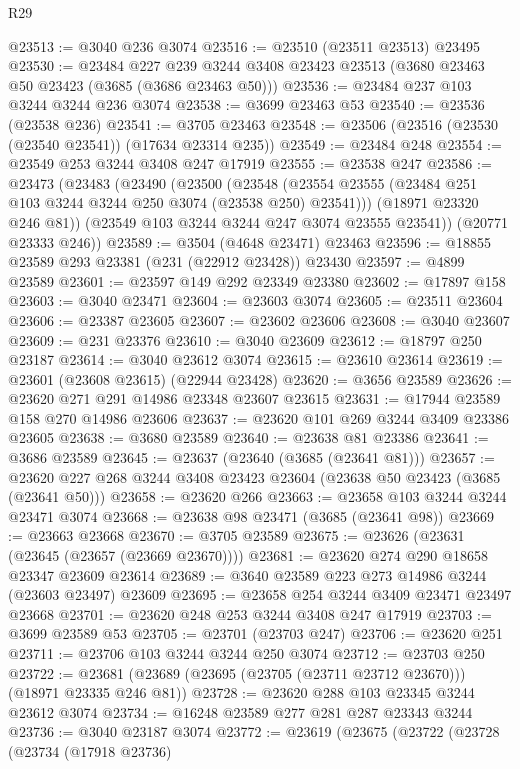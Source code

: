 \begin{lexlean}{R29}
\begin{coremodule}
@23513 := @3040 @236 @3074
@23516 := @23510 (@23511 @23513) @23495
@23530 := @23484
    @227
    @239
    @3244
    @3408
    @23423
    @23513
    (@3680 @23463 @50 @23423 (@3685 (@3686 @23463 @50)))
@23536 := @23484 @237 @103 @3244 @3244 @236 @3074
@23538 := @3699 @23463 @53
@23540 := @23536 (@23538 @236)
@23541 := @3705 @23463
@23548 := @23506 (@23516 (@23530 (@23540 @23541)) (@17634 @23314 @235))
@23549 := @23484 @248
@23554 := @23549 @253 @3244 @3408 @247 @17919
@23555 := @23538 @247
@23586 := @23473
    (@23483
      (@23490
        (@23500
          (@23548 (@23554 @23555 (@23484 @251 @103 @3244 @3244 @250 @3074 (@23538 @250) @23541)))
          (@18971 @23320 @246 @81))
        (@23549 @103 @3244 @3244 @247 @3074 @23555 @23541))
      (@20771 @23333 @246))
@23589 := @3504 (@4648 @23471) @23463
@23596 := @18855 @23589 @293 @23381 (@231 (@22912 @23428)) @23430
@23597 := @4899 @23589
@23601 := @23597 @149 @292 @23349 @23380
@23602 := @17897 @158
@23603 := @3040 @23471
@23604 := @23603 @3074
@23605 := @23511 @23604
@23606 := @23387 @23605
@23607 := @23602 @23606
@23608 := @3040 @23607
@23609 := @231 @23376
@23610 := @3040 @23609
@23612 := @18797 @250 @23187
@23614 := @3040 @23612 @3074
@23615 := @23610 @23614
@23619 := @23601 (@23608 @23615) (@22944 @23428)
@23620 := @3656 @23589
@23626 := @23620 @271 @291 @14986 @23348 @23607 @23615
@23631 := @17944 @23589 @158 @270 @14986 @23606
@23637 := @23620 @101 @269 @3244 @3409 @23386 @23605
@23638 := @3680 @23589
@23640 := @23638 @81 @23386
@23641 := @3686 @23589
@23645 := @23637 (@23640 (@3685 (@23641 @81)))
@23657 := @23620 @227 @268 @3244 @3408 @23423 @23604 (@23638 @50 @23423 (@3685 (@23641 @50)))
@23658 := @23620 @266
@23663 := @23658 @103 @3244 @3244 @23471 @3074
@23668 := @23638 @98 @23471 (@3685 (@23641 @98))
@23669 := @23663 @23668
@23670 := @3705 @23589
@23675 := @23626 (@23631 (@23645 (@23657 (@23669 @23670))))
@23681 := @23620 @274 @290 @18658 @23347 @23609 @23614
@23689 := @3640 @23589 @223 @273 @14986 @3244 (@23603 @23497) @23609
@23695 := @23658 @254 @3244 @3409 @23471 @23497 @23668
@23701 := @23620 @248 @253 @3244 @3408 @247 @17919
@23703 := @3699 @23589 @53
@23705 := @23701 (@23703 @247)
@23706 := @23620 @251
@23711 := @23706 @103 @3244 @3244 @250 @3074
@23712 := @23703 @250
@23722 := @23681 (@23689 (@23695 (@23705 (@23711 @23712 @23670))) (@18971 @23335 @246 @81))
@23728 := @23620 @288 @103 @23345 @3244 @23612 @3074
@23734 := @16248 @23589 @277 @281 @287 @23343 @3244
@23736 := @3040 @23187 @3074
@23772 := @23619
    (@23675
      (@23722
        (@23728
          (@23734
            (@17918 @23736)

\end{coremodule}
\end{lexlean}
